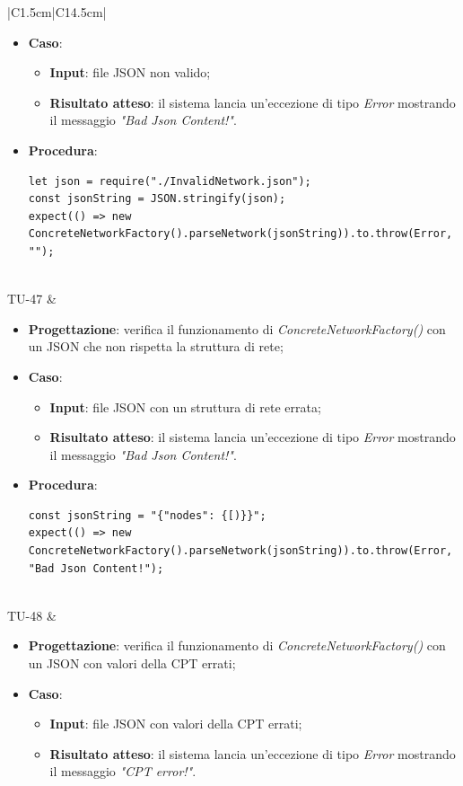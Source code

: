 \begin{longtable}{|C{1.5cm}|C{14.5cm}|}
\begin{itemize}
		\item \textbf{Caso}: 
		\begin{itemize}
			\item \textbf{Input}: file JSON non valido;
			\item \textbf{Risultato atteso}: il sistema lancia un'eccezione di tipo \emph{Error} mostrando il messaggio \emph{"Bad Json Content!"}.
		\end{itemize}
		\item \textbf{Procedura}:
		\begin{lstlisting}
let json = require("./InvalidNetwork.json");
const jsonString = JSON.stringify(json);
expect(() => new ConcreteNetworkFactory().parseNetwork(jsonString)).to.throw(Error, "");
		\end{lstlisting}
	\end{itemize}\\
	\hline
	{TU-47} &
	\begin{itemize}
		\item \textbf{Progettazione}: verifica il funzionamento di \emph{ConcreteNetworkFactory()} con un JSON che non rispetta la struttura di rete;
		\item \textbf{Caso}: 
		\begin{itemize}
			\item \textbf{Input}: file JSON con un struttura di rete errata;
			\item \textbf{Risultato atteso}: il sistema lancia un'eccezione di tipo \emph{Error} mostrando il messaggio \emph{"Bad Json Content!"}.
		\end{itemize}
		\item \textbf{Procedura}:
		\begin{lstlisting}
const jsonString = "{"nodes": {[)}}";
expect(() => new ConcreteNetworkFactory().parseNetwork(jsonString)).to.throw(Error, "Bad Json Content!");
		\end{lstlisting}
	\end{itemize}\\
	\hline
	{TU-48} &
	\begin{itemize}
		\item \textbf{Progettazione}: verifica il funzionamento di \emph{ConcreteNetworkFactory()} con un JSON con valori della CPT errati;
		\item \textbf{Caso}: 
		\begin{itemize}
			\item \textbf{Input}: file JSON con valori della CPT errati;
			\item \textbf{Risultato atteso}: il sistema lancia un'eccezione di tipo \emph{Error} mostrando il messaggio \emph{"CPT error!"}.

\end{itemize}
\end{itemize}
\end{longtable}
